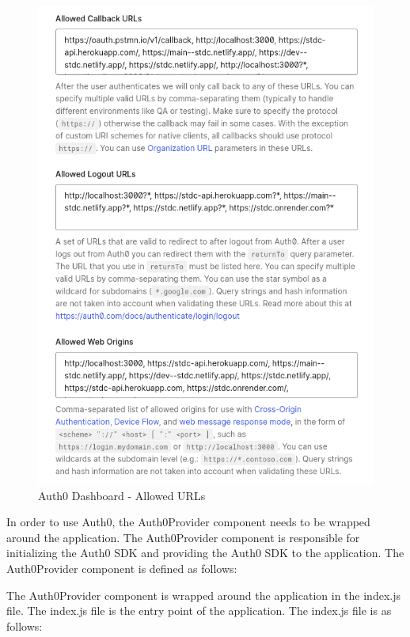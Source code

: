 \begin{justify}
\begin{itemize}
            \begin{figure}[H]
                \centerline{\includegraphics[width=150mm,scale=1]{figures/implementation_and_testing/implementation/frontend/URLS.png}}
                \caption{Auth0 Dashboard - Allowed URLs}
            \end{figure}
        \end{itemize}


        \vspace{-0.25cm}
        \newendline In order to use Auth0, the Auth0Provider component needs to be wrapped around the application. The Auth0Provider component is responsible for initializing the Auth0 SDK and providing the Auth0 SDK to the application. The Auth0Provider component is defined as follows:
        
        \vspace{0.25cm}
        \newendline The Auth0Provider component is wrapped around the application in the index.js file. The index.js file is the entry point of the application. The index.js file is as follows:
        

\end{justify}

